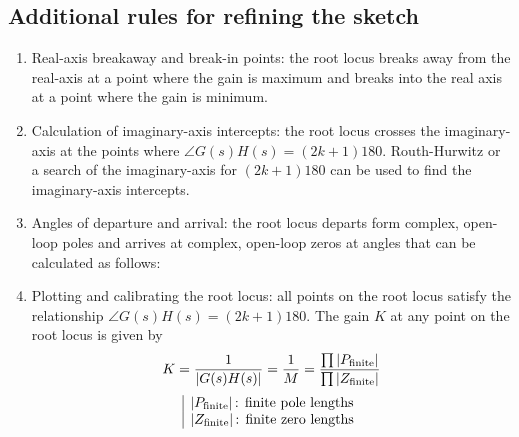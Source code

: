 \documentclass[10pt, twocolumn]{article}
\begin{document}
\subsection{Additional rules for refining the sketch}
\begin{enumerate}
  \item Real-axis breakaway and break-in points: the root locus breaks away from the real-axis at a point where the gain is maximum and breaks into the real axis at a point where the gain is minimum.
  \item Calculation of imaginary-axis intercepts: the root locus crosses the imaginary-axis at the points where \(\angle G(s)H(s) = (2k + 1)180\).
        Routh-Hurwitz or a search of the imaginary-axis for \((2k + 1)180\) can be used to find the imaginary-axis intercepts.
  \item Angles of departure and arrival: the root locus departs form complex, open-loop poles and arrives at complex, open-loop zeros at angles that can be calculated as follows:
  \item Plotting and calibrating the root locus: all points on the root locus satisfy the relationship  \(\angle G(s)H(s) = (2k + 1)180\).
        The gain \(K\) at any point on the root locus is given by
        \[
          K = \frac{1}{\left| G(s)H(s) \right|} = \frac{1}{M} = \frac{\prod{\left| P_\mathrm{finite} \right|}}{\prod{\left| Z_\mathrm{finite} \right|}}
        \]
        \[
          \begin{array}{|l}
            \left| P_\mathrm{finite} \right| \text{: finite pole lengths} \\
            \left| Z_\mathrm{finite} \right| \text{: finite zero lengths}
          \end{array}
        \]
\end{enumerate}
\end{document}
